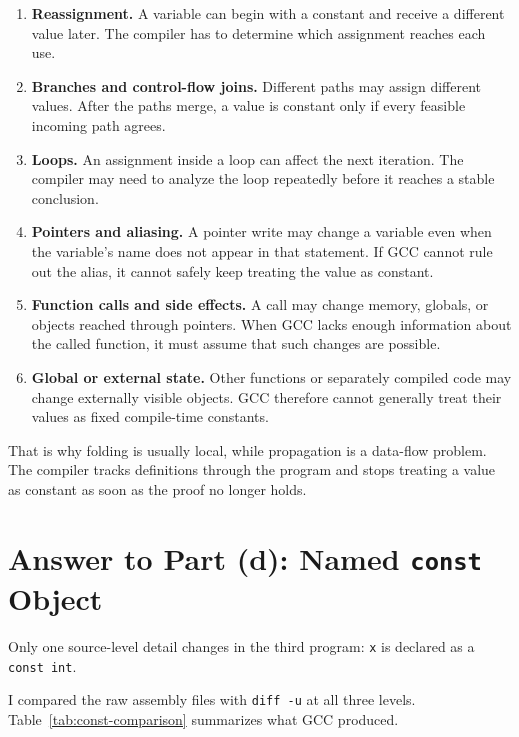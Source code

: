 \documentclass[11pt]{article}
\newcommand{\code}[1]{\texttt{#1}}
\begin{document}
\begin{enumerate}
  \item \textbf{Reassignment.} A variable can begin with a constant and receive
    a different value later. The compiler has to determine which assignment
    reaches each use.
  \item \textbf{Branches and control-flow joins.} Different paths may assign
    different values. After the paths merge, a value is constant only if every
    feasible incoming path agrees.
  \item \textbf{Loops.} An assignment inside a loop can affect the next
    iteration. The compiler may need to analyze the loop repeatedly before it
    reaches a stable conclusion.
  \item \textbf{Pointers and aliasing.} A pointer write may change a variable
    even when the variable's name does not appear in that statement. If GCC
    cannot rule out the alias, it cannot safely keep treating the value as
    constant.
  \item \textbf{Function calls and side effects.} A call may change memory,
    globals, or objects reached through pointers. When GCC lacks enough
    information about the called function, it must assume that such changes are
    possible.
  \item \textbf{Global or external state.} Other functions or separately
    compiled code may change externally visible objects. GCC therefore cannot
    generally treat their values as fixed compile-time constants.
\end{enumerate}

That is why folding is usually local, while propagation is a data-flow problem.
The compiler tracks definitions through the program and stops treating a value
as constant as soon as the proof no longer holds.

\clearpage
\section{Answer to Part (d): Named \code{const} Object}

Only one source-level detail changes in the third program: \code{x} is declared
as a \code{const int}.



I compared the raw assembly files with \code{diff -u} at all three levels.
Table~\ref{tab:const-comparison} summarizes what GCC produced.
\end{document}
